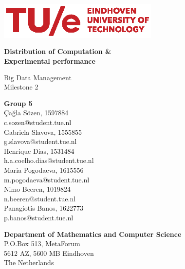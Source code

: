 \documentclass{article}
\begin{document}
\begin{titlepage}
    \begin{center}
        \includegraphics[width=0.6\textwidth]{tuelogo}
    
        \vspace*{1cm}
    
        {\huge \textbf{Distribution of Computation \&\\Experimental performance}}\\
        \vspace*{0.25cm}
        
        {\Large Big Data Management}\\
        
        \large{Milestone 2}
    
    \end{center}
    
    \vfill
       
    {\parindent0pt
        \textbf{Group 5}\\
        
        Çağla Sözen, 1597884\\
        c.sozen@student.tue.nl\\
        
        Gabriela Slavova, 1555855\\
        g.slavova@student.tue.nl\\
        
        Henrique Dias, 1531484\\
        h.a.coelho.dias@student.tue.nl\\
        
        Maria Pogodaeva, 1615556\\
        m.pogodaeva@student.tue.nl\\
        
        Nimo Beeren, 1019824\\
        n.beeren@student.tue.nl\\
        
        Panagiotis Banos, 1622773\\
        p.banos@student.tue.nl\\
        
        \vspace*{1cm}
    
        \textbf{Department of Mathematics and Computer Science}\\
        P.O.Box 513, MetaForum\\
        5612 AZ, 5600 MB Eindhoven\\
        The Netherlands
    }
\end{titlepage}
\end{document}
